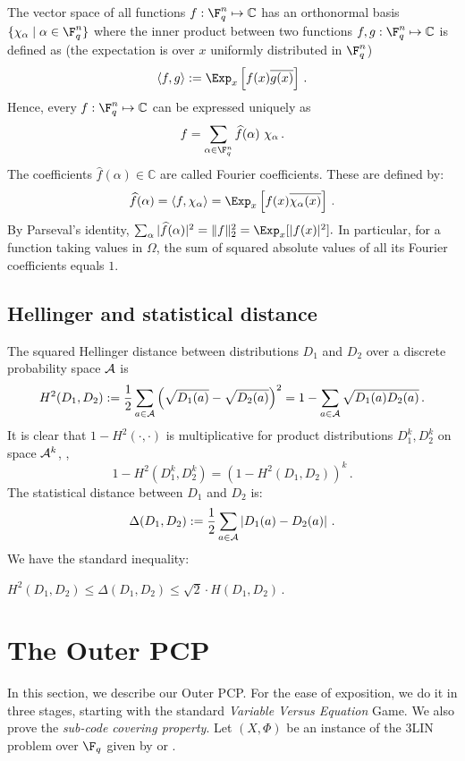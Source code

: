 The vector space of all functions $f : \F_q^n \mapsto {\mathbb C}$
has an orthonormal basis $\{ \chi_\alpha \mid \alpha \in \F_q^n\}$
where the inner product between two functions $f,g : \F_q^n \mapsto {\mathbb C}$ is defined as
(the expectation is over $x$ uniformly distributed in $\F_q^n$)
 $$ \left< f,g  \right> := \Exp_{x } \left[ f(x) \overline{g(x)}
 \right]\,. $$
Hence, every $f: \F_q^n \mapsto {\mathbb C}$ can be expressed
uniquely as
 $$ f = \sum_{\alpha \in \F_q^n}  \widehat{f}(\alpha) \ \chi_\alpha\,.
 $$
The coefficients $\widehat{f}(\alpha) \in {\mathbb C}$ are called
Fourier coefficients. These are defined by:
 $$ \widehat{f} (\alpha) = \left<f, \chi_\alpha \right> = \Exp_{x} \left[ f(x) \overline{\chi_\alpha(x)}
 \right]\,. $$
By Parseval's identity, $\sum_\alpha | \widehat{f}(\alpha)|^2
 = \| f\|_2^2 = \Exp_x [ |f(x)|^2]. $ In particular, for a function taking values in $\Omega$,
the sum of squared absolute values of all its Fourier coefficients equals $1$.


%
%
%
%



\subsection{Hellinger and statistical distance}

The squared Hellinger distance between distributions $D_1$ and $D_2$ over a discrete probability space
${\cal A}$ is
\[
H^2(D_1,D_2) := \frac{1}{2} \sum_{a\in {\cal A}}\left(\sqrt{D_1(a)}
  - \sqrt{D_2(a)}\right)^2 = 1 - \sum_{a\in {\cal A}}\sqrt{D_1(a)
  D_2(a)}\,.
\]
It is clear that $1-H^2(\cdot , \cdot)$ is multiplicative for product distributions $D_1^k, D_2^k$ on space
${\cal A}^k$, \ie,
  $$ 1-H^2(D_1^k, D_2^k) =  (1-H^2(D_1,D_2))^k\,.   $$
The statistical distance between $D_1$ and $D_2$ is:
$$\Delta(D_1,D_2) :=  \frac{1}{2} \sum_{a\in {\cal A}}\left|D_1(a) - D_2(a)\right|\,.$$
We have the standard inequality:
\begin{lemma}\label{p:Hellinger} 
$\displaystyle H^2(D_1,D_2) \leq \Delta(D_1,D_2) \leq \sqrt{2} \cdot H(D_1,D_2)\,.$
\end{lemma}









\section{The Outer PCP}\label{sec:outer}
In this section, we describe our Outer PCP\@. For the ease of exposition, we do it in three stages,
starting with the standard \emph{Variable Versus Equation} Game. We also prove the \emph{sub-code covering property}.
Let $(X, \Phi)$ be an instance of the 3LIN problem over $\F_q$ given by 
or .


